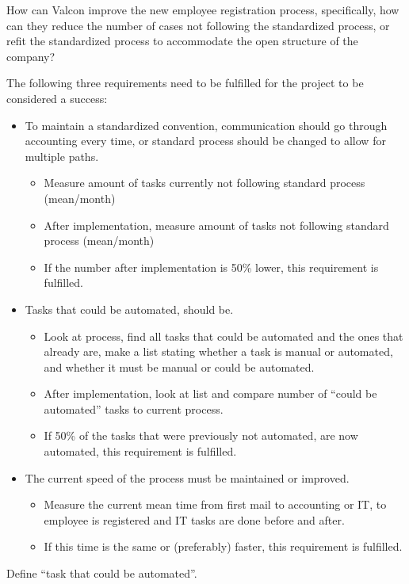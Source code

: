 How can Valcon improve the new employee registration process, specifically, how can they reduce the number of cases not following the standardized process, or refit the standardized process to accommodate the open structure of the company?

The following three requirements need to be fulfilled for the project to be considered a success:
\begin{itemize}
\item
To maintain a standardized convention, communication should go through accounting every time, or standard process should be changed to allow for multiple paths.
\begin{itemize}
\item
Measure amount of tasks currently not following standard process (mean/month)
\item
After implementation, measure amount of tasks not following standard process (mean/month)
\item
If the number after implementation is 50\% lower, this requirement is fulfilled.
\end{itemize}
\item
Tasks that could be automated, should be.
\begin{itemize}
\item
Look at process, find all tasks that could be automated and the ones that already are, make a list stating whether a task is manual or automated, and whether it must be manual or could be automated.
\item
After implementation, look at list and compare number of “could be automated” tasks to current process.
\item
If 50\% of the tasks that were previously not automated, are now automated, this requirement is fulfilled.
\end{itemize}
\item
The current speed of the process must be maintained or improved.
\begin{itemize}
\item
Measure the current mean time from first mail to accounting or IT, to employee is registered and IT tasks are done before and after.
\item
If this time is the same or (preferably) faster, this requirement is fulfilled.
\end{itemize}
\end{itemize}





Define “task that could be automated”.
